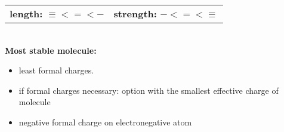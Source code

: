 \begin{tabular}{c c}
    \textbf{length:} $\equiv < = < -$ & \textbf{strength:} $- < = < \equiv$\\
\end{tabular}\\
\textbf{Most stable molecule:}
\begin{itemize}
    \itemsep0em
    \item least formal charges.
    \item if formal charges necessary: option with the smallest effective charge of molecule
    \item negative formal charge on electronegative atom
\end{itemize}
